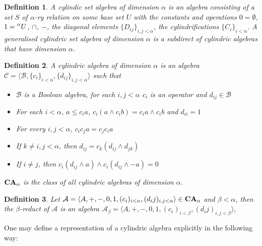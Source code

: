 \documentclass[a4paper]{article}
\theoremstyle{defin}
\newtheorem{defin}{Definition}
\theoremstyle{theorem}
\theoremstyle{prop}
\theoremstyle{lemma}
\theoremstyle{fact}
\theoremstyle{ex}
\theoremstyle{col}
\begin{document}
\begin{defin}
  A cylindic set algebra of dimension $\alpha$ is an algebra consisting of a set $S$ of $\alpha$-ry relation on some base set $U$
    with the constants and operations $0 = \emptyset$, $1 = \prescript{\alpha}{}U$, $\cap$, $-$, the diagonal elements $\{ D_{ij} \}_{i, j < \alpha}$, the cylindrifications $\{ C_i \}_{i < \alpha}$. A generalised cylindric set algebra of dimension $\alpha$ is a subdirect of cylindric algebras that have dimension $\alpha$.
\end{defin}

\begin{defin}
    A cylindric algebra of dimension $\alpha$ is an algebra $\mathcal{C} = \langle \mathcal{B}, \{ c_i \}_{i < \alpha}, \{ d_{ij} \}_{i, j < \alpha} \rangle$ such that
    \begin{itemize}
      \item $\mathcal{B}$ is a Boolean algebra, for each $i, j < \alpha$ $c_i$ is an operator and $d_{ij} \in \mathcal{B}$
      \item For each $i < \alpha$, $a \leq c_i a$, $c_i (a \land c_i b) = c_i a \land c_i b$ and $d_{ii} = 1$
      \item For every $i, j < \alpha$, $c_i c_j a = c_j c_i a$
      \item If $k \neq i, j < \alpha$, then $d_{ij} = c_k (d_{ij} \land d_{jk})$
      \item If $i \neq j$, then $c_i (d_{ij} \land a) \land c_i (d_{ij} \land - a) = 0$
    \end{itemize}
    ${\bf CA}_{\alpha}$ is the class of all cylindric algebras of dimension $\alpha$.
\end{defin}

\begin{defin}
  Let $\mathcal{A} = \langle A, +, -, 0, 1, (c_i)_{i < \alpha}, (d_ij)_{i,j < \alpha} \rangle \in {\bf CA}_{\alpha}$ and $\beta < \alpha$, then the $\beta$-reduct of $\mathcal{A}$ is an algebra $\mathcal{A}_{\beta} = \langle A, +, -, 0, 1, (c_i)_{i < \beta}, (d_ij)_{i,j < \beta} \rangle$,
\end{defin}

One may define a representation of a cylindric algebra explicitly in the following way:
\end{document}
